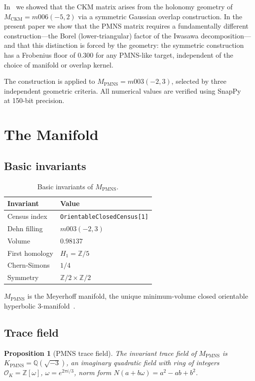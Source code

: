\documentclass[11pt,a4paper]{article}
\newtheorem{proposition}[theorem]{Proposition}
\theoremstyle{definition}
\newcommand{\MPMNS}{M_{\mathrm{PMNS}}}
\newcommand{\KPMNS}{K_{\mathrm{PMNS}}}
\newcommand{\Zom}{\mathbb{Z}[\omega]}
\newcommand{\Zfive}{\mathbb{Z}/5}
\begin{document}
In~\cite{Gentry:CKM} we showed that the CKM matrix arises from the
holonomy geometry of $M_{\mathrm{CKM}}=m006(-5,2)$ via a symmetric
Gaussian overlap construction. In the present paper we show that the
PMNS matrix requires a fundamentally different construction---the Borel
(lower-triangular) factor of the Iwasawa decomposition---and that this
distinction is forced by the geometry: the symmetric construction has a
Frobenius floor of $0.300$ for any PMNS-like target, independent of
the choice of manifold or overlap kernel.

The construction is applied to $\MPMNS=m003(-2,3)$, selected by
three independent geometric criteria. All numerical values are
verified using SnapPy~\cite{SnapPy} at 150-bit precision.

\section{The Manifold}
\label{sec:manifold}

\subsection{Basic invariants}

\begin{table}[htbp]
\centering
\caption{Basic invariants of $\MPMNS$.}
\begin{tabular}{ll}
\toprule
Invariant & Value \\
\midrule
Census index & \texttt{OrientableClosedCensus[1]} \\
Dehn filling & $m003(-2,3)$ \\
Volume & $0.98137$ \\
First homology & $H_1 = \Zfive$ \\
Chern-Simons & $1/4$ \\
Symmetry & $\mathbb{Z}/2\times\mathbb{Z}/2$ \\
\bottomrule
\end{tabular}
\end{table}

$\MPMNS$ is the Meyerhoff manifold, the unique minimum-volume closed
orientable hyperbolic 3-manifold~\cite{GMM}.

\subsection{Trace field}

\begin{proposition}[PMNS trace field]
The invariant trace field of $\MPMNS$ is
$\KPMNS = \mathbb{Q}(\sqrt{-3})$,
an imaginary quadratic field with ring of integers
$\mathcal{O}_K = \Zom$, $\omega = e^{2\pi i/3}$,
norm form $N(a+b\omega) = a^2-ab+b^2$.
\end{proposition}
\end{document}
